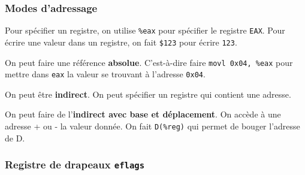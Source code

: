 \subsubsection{Modes d'adressage}\label{modes-dadressage}

Pour spécifier un registre, on utilise \texttt{\%eax} pour spécifier le
registre \texttt{EAX}. Pour écrire une valeur dans un registre, on fait
\texttt{\$123} pour écrire \texttt{123}.

\begin{Shaded}
\begin{Highlighting}[]
\end{Highlighting}
\end{Shaded}

On peut faire une référence \textbf{absolue}. C'est-à-dire faire
\texttt{movl\ 0x04,\ \%eax} pour mettre dans \texttt{eax} la valeur se
trouvant à l'adresse \texttt{0x04}.

On peut être \textbf{indirect}. On peut spécifier un registre qui
contient une adresse.

\begin{Shaded}
\begin{Highlighting}[]
\end{Highlighting}
\end{Shaded}

On peut faire de l'\textbf{indirect avec base et déplacement}. On accède
à une adresse + ou - la valeur donnée. On fait \texttt{D(\%reg)} qui
permet de bouger l'adresse de D.

\begin{Shaded}
\begin{Highlighting}[]
\end{Highlighting}
\end{Shaded}

\subsubsection{\texorpdfstring{Registre de drapeaux
\texttt{eflags}}{Registre de drapeaux eflags}}\label{registre-de-drapeaux-eflags}


